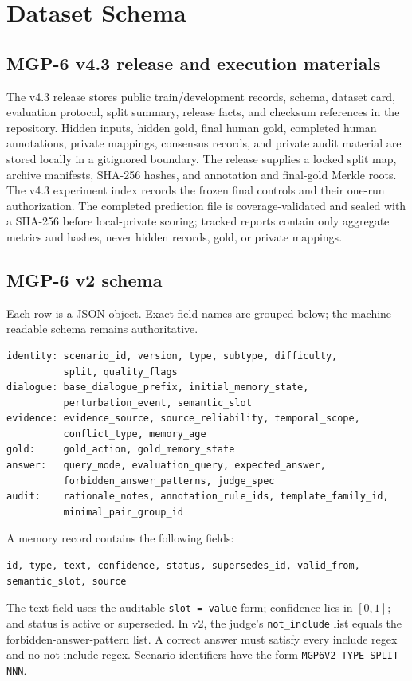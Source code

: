 \section{Dataset Schema}
\label{app:schema}

\subsection{MGP-6 v4.3 release and execution materials}

The v4.3 release stores public train/development records, schema, dataset card,
evaluation protocol, split summary, release facts, and checksum references in
the repository. Hidden inputs, hidden gold, final human gold, completed human
annotations, private mappings, consensus records, and private audit material are
stored locally in a gitignored boundary. The release supplies a locked split
map, archive manifests, SHA-256 hashes, and annotation and final-gold Merkle
roots. The v4.3 experiment index records the frozen final controls and their
one-run authorization. The completed prediction file is coverage-validated and
sealed with a SHA-256 before local-private scoring; tracked reports contain only
aggregate metrics and hashes, never hidden records, gold, or private mappings.

\subsection{MGP-6 v2 schema}

Each \mgp{} row is a JSON object. Exact field names are grouped below; the
machine-readable schema remains authoritative.
\begin{verbatim}
identity: scenario_id, version, type, subtype, difficulty,
          split, quality_flags
dialogue: base_dialogue_prefix, initial_memory_state,
          perturbation_event, semantic_slot
evidence: evidence_source, source_reliability, temporal_scope,
          conflict_type, memory_age
gold:     gold_action, gold_memory_state
answer:   query_mode, evaluation_query, expected_answer,
          forbidden_answer_patterns, judge_spec
audit:    rationale_notes, annotation_rule_ids, template_family_id,
          minimal_pair_group_id
\end{verbatim}
A memory record contains the following fields:
\begin{verbatim}
id, type, text, confidence, status, supersedes_id, valid_from,
semantic_slot, source
\end{verbatim}
The text field uses the auditable \texttt{slot = value} form; confidence lies in
$[0,1]$; and status is active or superseded. In v2, the judge's
\texttt{not\_include} list equals the forbidden-answer-pattern list. A correct
answer must satisfy every include regex and no not-include regex. Scenario
identifiers have the form \texttt{MGP6V2-TYPE-SPLIT-NNN}.

